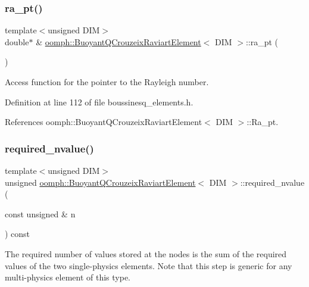 \subsubsection{\texorpdfstring{ra\+\_\+pt()}{ra\_pt()}}
{\footnotesize\ttfamily template$<$unsigned D\+IM$>$ \\
double$\ast$ \& \hyperlink{classoomph_1_1BuoyantQCrouzeixRaviartElement}{oomph\+::\+Buoyant\+Q\+Crouzeix\+Raviart\+Element}$<$ D\+IM $>$\+::ra\+\_\+pt (\begin{DoxyParamCaption}{ }\end{DoxyParamCaption})\hspace{0.3cm}{\ttfamily [inline]}}



Access function for the pointer to the Rayleigh number. 



Definition at line 112 of file boussinesq\+\_\+elements.\+h.



References oomph\+::\+Buoyant\+Q\+Crouzeix\+Raviart\+Element$<$ D\+I\+M $>$\+::\+Ra\+\_\+pt.

\mbox{\label{classoomph_1_1BuoyantQCrouzeixRaviartElement_a64b84c9cf74a06680136d465ff9e037b}} 
\subsubsection{\texorpdfstring{required\+\_\+nvalue()}{required\_nvalue()}}
{\footnotesize\ttfamily template$<$unsigned D\+IM$>$ \\
unsigned \hyperlink{classoomph_1_1BuoyantQCrouzeixRaviartElement}{oomph\+::\+Buoyant\+Q\+Crouzeix\+Raviart\+Element}$<$ D\+IM $>$\+::required\+\_\+nvalue (\begin{DoxyParamCaption}\item[{const unsigned \&}]{n }\end{DoxyParamCaption}) const\hspace{0.3cm}{\ttfamily [inline]}}



The required number of values stored at the nodes is the sum of the required values of the two single-\/physics elements. Note that this step is generic for any multi-\/physics element of this type. 



